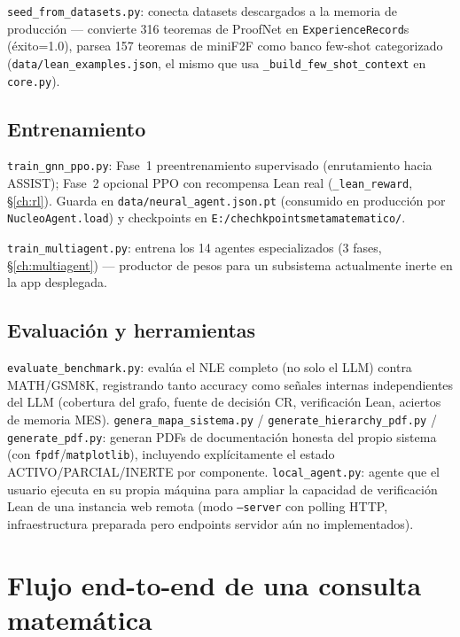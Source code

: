 \documentclass[11pt,a4paper]{report}
\newcommand{\code}[1]{\texttt{#1}}
\begin{document}
\code{seed_from_datasets.py}: conecta datasets descargados a la memoria de producci\'on --- convierte 316 teoremas de ProofNet en \code{ExperienceRecord}s (\'exito=1.0), parsea 157 teoremas de miniF2F como banco few-shot categorizado (\code{data/lean\_examples.json}, el mismo que usa \code{\_build_few_shot_context} en \code{core.py}).

\section{Entrenamiento}

\code{train_gnn_ppo.py}: Fase~1 preentrenamiento supervisado (enrutamiento hacia ASSIST); Fase~2 opcional PPO con recompensa Lean real (\code{\_lean_reward}, \S\ref{ch:rl}). Guarda en \code{data/neural_agent.json.pt} (consumido en producci\'on por \code{NucleoAgent.load}) y checkpoints en \code{E:/chechkpointsmetamatematico/}.

\code{train_multiagent.py}: entrena los 14 agentes especializados (3 fases, \S\ref{ch:multiagent}) --- productor de pesos para un subsistema actualmente inerte en la app desplegada.

\section{Evaluaci\'on y herramientas}

\code{evaluate_benchmark.py}: eval\'ua el NLE completo (no solo el LLM) contra MATH/GSM8K, registrando tanto accuracy como se\~nales internas independientes del LLM (cobertura del grafo, fuente de decisi\'on CR, verificaci\'on Lean, aciertos de memoria MES). \code{genera_mapa_sistema.py} / \code{generate_hierarchy_pdf.py} / \code{generate_pdf.py}: generan PDFs de documentaci\'on honesta del propio sistema (con \code{fpdf}/\code{matplotlib}), incluyendo expl\'icitamente el estado ACTIVO/PARCIAL/INERTE por componente. \code{local_agent.py}: agente que el usuario ejecuta en su propia m\'aquina para ampliar la capacidad de verificaci\'on Lean de una instancia web remota (modo \code{--server} con polling HTTP, infraestructura preparada pero endpoints servidor a\'un no implementados).

\chapter{Flujo end-to-end de una consulta matem\'atica}
\end{document}
